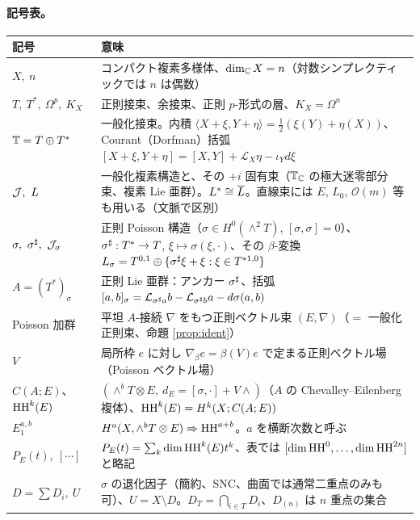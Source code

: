 \paragraph{記号表。}
\begin{longtable}{>{\raggedright\arraybackslash}p{3.5cm}>{\raggedright\arraybackslash}p{11.3cm}}
\toprule 記号 & 意味\\ \midrule\endhead
\bottomrule\endfoot
\footnotesize $X,\ n$ & コンパクト複素多様体、$\dim_\mathbb C X=n$（対数シンプレクティックでは $n$ は偶数）\\
\footnotesize $T,\ T^*,\ \Omega^p,\ K_X$ & 正則接束、余接束、正則 $p$-形式の層、$K_X=\Omega^n$\\
\footnotesize $\mathbb T=T\oplus T^*$ & 一般化接束。内積 $\langle X+\xi,Y+\eta\rangle=\tfrac12(\xi(Y)+\eta(X))$、Courant（Dorfman）括弧 $[X+\xi,Y+\eta]=[X,Y]+\mathcal L_X\eta-\iota_Yd\xi$\\
\footnotesize $\Jc,\ L$ & 一般化複素構造と、その $+i$ 固有束（$\mathbb T_\mathbb C$ の極大迷零部分束、複素 Lie 亜群）。$L^*\cong\overline L$。直線束には $E$, $L_0$, $\mathcal O(m)$ 等も用いる（文脈で区別）\\
\footnotesize $\sigma,\ \sigma^\sh,\ \Jc_\sigma$ & 正則 Poisson 構造（$\sigma\in H^0(\wedge^2T)$, $[\sigma,\sigma]=0$）、$\sigma^\sharp:T^*\to T$, $\xi\mapsto\sigma(\xi,\cdot)$、その $\beta$-変換 $L_\sigma=T^{0,1}\oplus\{\sigma^\sharp\xi+\xi:\xi\in T^{*1,0}\}$\\
\footnotesize $A=(T^*)_\sigma$ & 正則 Lie 亜群：アンカー $\sigma^\sharp$、括弧 $[a,b]_\sigma=\mathcal L_{\sigma^\sharp a}b-\mathcal L_{\sigma^\sharp b}a-d\sigma(a,b)$\\
\footnotesize Poisson 加群 & 平坦 $A$-接続 $\nabla$ をもつ正則ベクトル束 $(E,\nabla)$（$=$ 一般化正則束、命題 \ref{prop:ident}）\\
\footnotesize $V$ & 局所枠 $e$ に対し $\nabla_\beta e=\beta(V)e$ で定まる正則ベクトル場（Poisson ベクトル場）\\
\footnotesize $C(A;E)$、$\mathrm{HH}^k(E)$ & $(\wedge^bT\otimes E,\ d_E=[\sigma,\cdot]+V\wedge)$（$A$ の Chevalley--Eilenberg 複体）、$\mathrm{HH}^k(E)=H^k(X;C(A;E))$\\
\footnotesize $E_1^{a,b}$ & $H^a(X,\wedge^bT\otimes E)\Rightarrow\mathrm{HH}^{a+b}$。$a$ を横断次数と呼ぶ\\
\footnotesize $P_E(t),\ [\cdots]$ & $P_E(t)=\sum_k\dim\mathrm{HH}^k(E)t^k$、表では $[\dim\mathrm{HH}^0,\dots,\dim\mathrm{HH}^{2n}]$ と略記\\
\footnotesize $D=\sum D_i,\ U$ & $\sigma$ の退化因子（簡約、SNC、曲面では通常二重点のみも可）、$U=X\setminus D$。$D_T=\bigcap_{i\in T}D_i$、$D_{(n)}$ は $n$ 重点の集合\\

\end{longtable}
